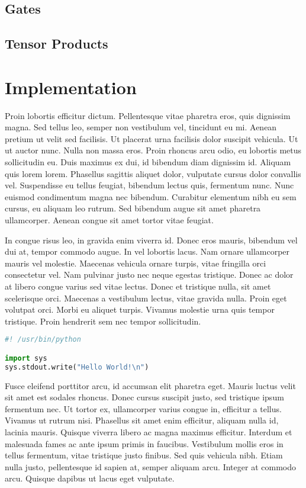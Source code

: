 \documentclass{article}
\begin{document}
\subsection{Gates}
\subsection{Tensor Products}

\section{Implementation}

Proin lobortis efficitur dictum. Pellentesque vitae pharetra eros, quis dignissim magna. Sed tellus leo, semper non vestibulum vel, tincidunt eu mi. Aenean pretium ut velit sed facilisis. Ut placerat urna facilisis dolor suscipit vehicula. Ut ut auctor nunc. Nulla non massa eros. Proin rhoncus arcu odio, eu lobortis metus sollicitudin eu. Duis maximus ex dui, id bibendum diam dignissim id. Aliquam quis lorem lorem. Phasellus sagittis aliquet dolor, vulputate cursus dolor convallis vel. Suspendisse eu tellus feugiat, bibendum lectus quis, fermentum nunc. Nunc euismod condimentum magna nec bibendum. Curabitur elementum nibh eu sem cursus, eu aliquam leo rutrum. Sed bibendum augue sit amet pharetra ullamcorper. Aenean congue sit amet tortor vitae feugiat.

In congue risus leo, in gravida enim viverra id. Donec eros mauris, bibendum vel dui at, tempor commodo augue. In vel lobortis lacus. Nam ornare ullamcorper mauris vel molestie. Maecenas vehicula ornare turpis, vitae fringilla orci consectetur vel. Nam pulvinar justo nec neque egestas tristique. Donec ac dolor at libero congue varius sed vitae lectus. Donec et tristique nulla, sit amet scelerisque orci. Maecenas a vestibulum lectus, vitae gravida nulla. Proin eget volutpat orci. Morbi eu aliquet turpis. Vivamus molestie urna quis tempor tristique. Proin hendrerit sem nec tempor sollicitudin.

\begin{file}[hello.py]
\begin{lstlisting}[language=Python]
#! /usr/bin/python

import sys
sys.stdout.write("Hello World!\n")
\end{lstlisting}
\end{file}

Fusce eleifend porttitor arcu, id accumsan elit pharetra eget. Mauris luctus velit sit amet est sodales rhoncus. Donec cursus suscipit justo, sed tristique ipsum fermentum nec. Ut tortor ex, ullamcorper varius congue in, efficitur a tellus. Vivamus ut rutrum nisi. Phasellus sit amet enim efficitur, aliquam nulla id, lacinia mauris. Quisque viverra libero ac magna maximus efficitur. Interdum et malesuada fames ac ante ipsum primis in faucibus. Vestibulum mollis eros in tellus fermentum, vitae tristique justo finibus. Sed quis vehicula nibh. Etiam nulla justo, pellentesque id sapien at, semper aliquam arcu. Integer at commodo arcu. Quisque dapibus ut lacus eget vulputate.
\end{document}
